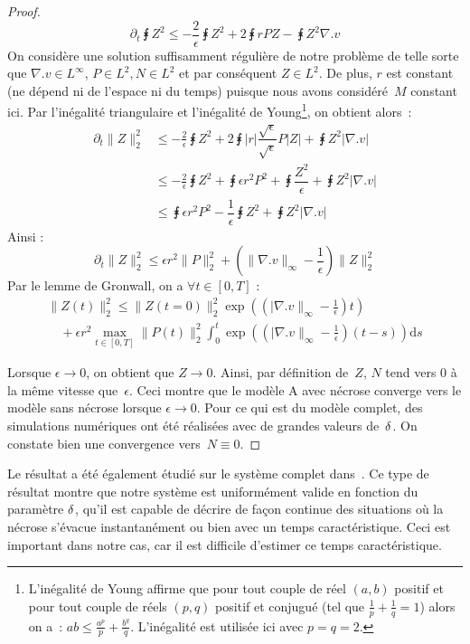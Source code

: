 \documentclass[main.tex]{subfiles}
\begin{document}
\begin{proof}
\begin{equation}
 \partial_t \intx Z^2 \leq - \frac{2}{\epsilon} \intx Z^2 + 2 \intx rPZ - \intx Z^2 \nabla.v
\end{equation}
On considère une solution suffisamment régulière de notre problème de telle sorte que $\nabla.v \in L^\infty$, $P \in L^2, N \in L^2$ et par conséquent $Z \in L^2$. De plus, $r$ est constant (\ie ne dépend ni de l'espace ni du temps) puisque nous avons considéré~$M$ constant ici. Par l'inégalité triangulaire et l'inégalité de Young\footnote{L'inégalité de Young affirme que pour tout couple de réel $(a,b)$ positif et pour tout couple de réels $(p,q)$ positif et conjugué (\ie tel que $\frac{1}{p}+\frac{1}{q}=1$) alors on a~: $ab \leq \frac{a^p}{p} + \frac{b^q}{q}$. L'inégalité est utilisée ici avec $p=q=2$. }, 
on obtient alors~:
\begin{align*}
\partial_t \| Z \|^2_2 & \leq -\frac{2}{\epsilon} \intx Z^2 + 2 \intx  |r| \dfrac{\sqrt{\epsilon}}{\sqrt{\epsilon}} P|Z| + \intx Z^2 | \nabla.v | \\
& \leq -\frac{2}{\epsilon} \intx Z^2 + \intx \epsilon r^2 P^2 + \intx \dfrac{Z^2}{\epsilon}  + \intx Z^2 | \nabla.v | \\
& \leq \intx \epsilon r^2 P^2 - \dfrac{1}{\epsilon} \intx Z^2  + \intx Z^2 | \nabla.v | 
\end{align*}
Ainsi :
\begin{equation}
\partial_t \|Z\|_2^2 \leq \epsilon r^2 \|P\|_2^2 + \left( \|\nabla.v\|_\infty - \frac{1}{\epsilon} \right) \| Z \|^2_2
\end{equation}
Par le lemme de Gronwall, on a $\forall t\in [0,T]$ :
\begin{equation}
\begin{array}{l}
\displaystyle \|Z(t)\|^2_2 \leq \|Z(t=0)\|_2^2 \exp \left(  \left(  |\nabla.v\|_\infty - \frac{1}{\epsilon} \right) t\right) \\
\displaystyle \quad + \epsilon r^2 \max_{t\in[0,T]} \| P(t) \|^2_2 \int_0^t \exp \left(  \left(  |\nabla.v\|_\infty - \frac{1}{\epsilon} \right) (t-s) \right) \textrm{d}s
\end{array}
\end{equation}

Lorsque $\epsilon \to 0$, on obtient que $Z \to 0$. Ainsi, par définition de~$Z$, $N$ tend vers 0 à la même vitesse que~$\epsilon$. Ceci montre que le modèle A avec nécrose converge vers le modèle sans nécrose lorsque $\epsilon \to 0$. 
Pour ce qui est du modèle complet, des simulations numériques ont été réalisées avec de grandes valeurs de~$\delta$. On constate bien une convergence vers~$N\equiv0$.
\end{proof}
Le résultat a été également étudié sur le système complet dans~\cite{michel:hal-01211770}. Ce type de résultat montre que notre système est uniformément valide en fonction du paramètre $\delta$, \cad qu'il est capable de décrire de façon continue des situations où la nécrose s'évacue instantanément ou bien avec un temps caractéristique. Ceci est important dans notre cas, car il est difficile d'estimer ce temps caractéristique.
\end{document}
